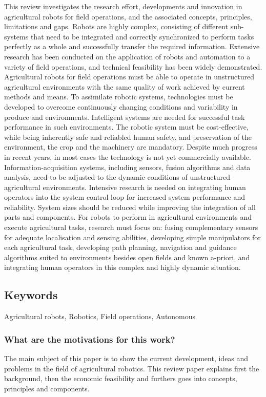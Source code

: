     This review investigates the research effort, developments and innovation in agricultural
    robots for field operations, and the associated concepts, principles, limitations and gaps.
    Robots are highly complex, consisting of different sub-systems that need to be integrated
    and correctly synchronized to perform tasks perfectly as a whole and successfully transfer
    the required information. Extensive research has been conducted on the application of
    robots and automation to a variety of field operations, and technical feasibility has been
    widely demonstrated. Agricultural robots for field operations must be able to operate in
    unstructured agricultural environments with the same quality of work achieved by current methods and means. To assimilate robotic systems, technologies must be developed
    to overcome continuously changing conditions and variability in produce and environments. Intelligent systems are needed for successful task performance in such environments. The robotic system must be cost-effective, while being inherently safe and
    reliabled human safety, and preservation of the environment, the crop and the machinery
    are mandatory. Despite much progress in recent years, in most cases the technology is not
    yet commercially available. Information-acquisition systems, including sensors, fusion
    algorithms and data analysis, need to be adjusted to the dynamic conditions of unstructured agricultural environments. Intensive research is needed on integrating human
    operators into the system control loop for increased system performance and reliability.
    System sizes should be reduced while improving the integration of all parts and components. For robots to perform in agricultural environments and execute agricultural
    tasks, research must focus on: fusing complementary sensors for adequate localisation
    and sensing abilities, developing simple manipulators for each agricultural task, developing path planning, navigation and guidance algorithms suited to environments besides
    open fields and known a-priori, and integrating human operators in this complex and
    highly dynamic situation.
    
    
    \subsection*{Keywords}
    Agricultural robots, Robotics, Field operations, Autonomous
    
    
     
    
    \subsubsection*{What are the motivations for this work?}
    The main subject of this paper is to show the current development, ideas and problems in the field of agricultural 
    robotics. This review paper explains first the background, then the economic feasibility and furthers goes into 
    concepts, principles and components.
